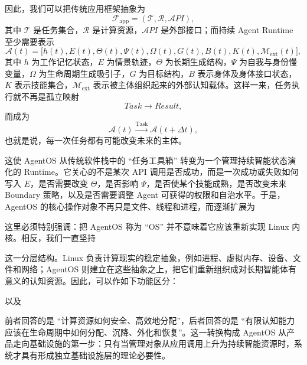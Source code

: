 因此，我们可以把传统应用框架抽象为
\[
\mathcal F_{\mathrm{app}}
=
(\mathcal T,\mathcal R,\mathcal API),
\]
其中 $\mathcal T$ 是任务集合，$\mathcal R$ 是计算资源，$\mathcal API$ 是外部接口；而持续 Agent Runtime 至少需要表示
\[
\mathcal A(t)
=
\bigl[
h(t),E(t),\Theta(t),\Psi(t),\Omega(t),
G(t),B(t),K(t),\mathcal M_{\mathrm{ext}}(t)
\bigr],
\]
其中 $h$ 为工作记忆状态，$E$ 为情景轨迹，$\Theta$ 为长期生成结构，$\Psi$ 为自我与身份慢变量，$\Omega$ 为生命周期生成吸引子，$G$ 为目标结构，$B$ 表示身体及身体接口状态，$K$ 表示技能集合，$\mathcal M_{\mathrm{ext}}$ 表示被主体组织起来的外部认知载体。这样一来，任务执行就不再是孤立映射
\[
Task\rightarrow Result,
\]
而成为
\[
\mathcal A(t)
\xrightarrow{\mathrm{Task}}
\mathcal A(t+\Delta t),
\]
也就是说，每一次任务都有可能改变未来的主体。

这使 AgentOS 从传统软件栈中的 ``任务工具箱'' 转变为一个管理持续智能状态演化的 Runtime。它关心的不是某次 API 调用是否成功，而是一次成功或失败如何写入 $E$，是否需要改变 $\Theta$，是否影响 $\Psi$，是否使某个技能成熟，是否改变未来 Boundary 策略，以及是否需要调整 Agent 可获得的权限和自治水平。于是，AgentOS 的核心操作对象不再只是文件、线程和进程，而逐渐扩展为
\begin{statementbox}
\centering
{}
\end{statementbox}

这里必须特别强调：把 AgentOS 称为 ``OS'' 并不意味着它应该重新实现 Linux 内核。相反，我们一直坚持
\begin{statementbox}
\centering
{}
\end{statementbox}
这一分层结构。Linux 负责计算现实的稳定抽象，例如进程、虚拟内存、设备、文件和网络；AgentOS 则建立在这些抽象之上，把它们重新组织成对长期智能体有意义的认知资源。因此，可以作如下功能区分：
\begin{statementbox}
\centering
{}
\end{statementbox}
以及
\begin{statementbox}
\centering
{}
\end{statementbox}

前者回答的是 ``计算资源如何安全、高效地分配''，后者回答的是 ``有限认知能力应该在生命周期中如何分配、沉降、外化和恢复''。这一转换构成 AgentOS 从产品走向基础设施的第一步：只有当管理对象从应用调用上升为持续智能资源时，系统才具有形成独立基础设施层的理论必要性。


